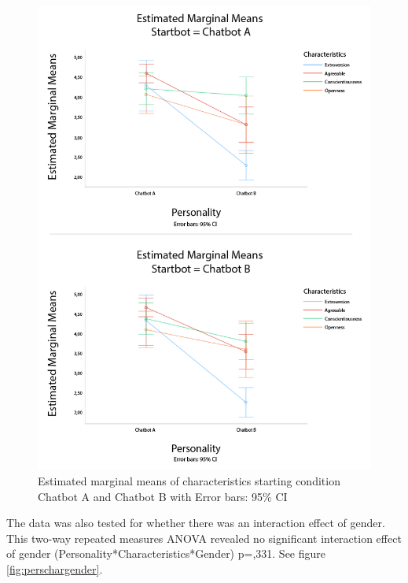 \begin{figure}[H]
    \centering
    \includegraphics[scale=0.4]{figures/Errorbars_characertistics.png}
    \caption{Estimated marginal means of characteristics starting condition Chatbot A and Chatbot B with Error bars: 95\% CI}
    \label{fig:errorCh}
\end{figure}

The data was also tested for whether there was an interaction effect of gender. This two-way repeated measures ANOVA revealed no significant interaction effect of gender (Personality*Characteristics*Gender) p=,331. See figure \ref{fig:perschargender}.


